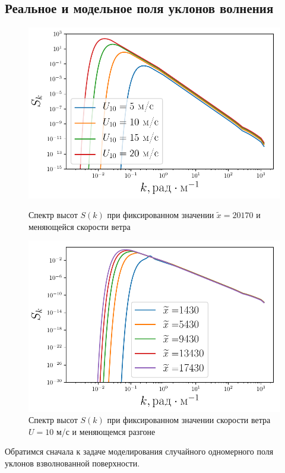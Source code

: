 \subsection{Реальное и модельное поля уклонов волнения}
\begin{figure}[h!]
	\begin{minipage}{0.49\linewidth}
			\centering
			\includegraphics[width=\linewidth]{fig/full_spectrum1.pdf}
			\caption{Спектр высот $S(k)$ при фиксированном значении $\tilde x=20170$ и меняющейся скорости ветра}		
			\label{fig:full_spectrum1}
	\end{minipage}
	\hfill
	\begin{minipage}{0.49\linewidth}
			\centering
			\includegraphics[width=\linewidth]{fig/full_spectrum2.pdf}
			\caption{Спектр высот $S(k)$ при фиксированном значении скорости ветра 
			$U=10$ м/с и меняющемся разгоне}		
			\label{fig:full_spectrum2}
	\end{minipage}
\end{figure}
Обратимся сначала к задаче моделирования случайного одномерного поля уклонов взволнованной поверхности. 

